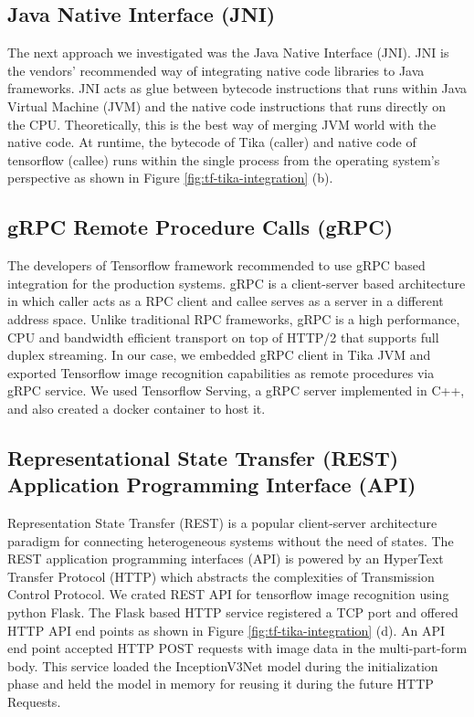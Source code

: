 \subsection{Java Native Interface (JNI)} \label{sec:int-jni}
The next approach we investigated was the Java Native Interface (JNI). JNI is the vendors' recommended way of integrating native code libraries to Java frameworks\cite{}. JNI acts as glue between bytecode instructions that runs within Java Virtual Machine (JVM) and the native  code instructions that runs directly on the CPU. Theoretically, this is the best way of merging JVM world with the native code\cite{}. At runtime, the bytecode of Tika (caller) and native code of tensorflow (callee) runs within the single process from the operating system's perspective as shown in Figure \ref{fig:tf-tika-integration} (b).


\subsection{gRPC Remote Procedure Calls (gRPC)} \label{sec:int-rpc}
The developers of Tensorflow framework recommended to use gRPC based integration for the production systems\cite{goog-tfserve}. gRPC is a client-server based architecture in which caller acts as a RPC client and callee serves as a server in a different address space. Unlike traditional RPC frameworks, gRPC is a high performance, CPU and bandwidth efficient transport on top of HTTP/2 that supports full duplex streaming\cite{about-grpc}. In our case, we embedded gRPC client in Tika JVM and exported Tensorflow image recognition capabilities as remote procedures via gRPC service. We used Tensorflow Serving, a gRPC server implemented in C++, and also created a docker container to host it.


\subsection{Representational State Transfer (REST) Application Programming Interface (API)} \label{sec:int-rest}
Representation State Transfer (REST) is a popular client-server architecture paradigm for connecting heterogeneous systems without the need of states\cite[Chapter~5]{Fielding:2000:ASD:932295}. The REST application programming interfaces (API) is powered by an HyperText Transfer Protocol (HTTP) which abstracts the complexities of Transmission Control Protocol.
We crated REST API for tensorflow image recognition using python Flask\cite{}. The Flask based HTTP service registered a TCP port and offered HTTP API end points as shown in Figure \ref{fig:tf-tika-integration} (d).
An API end point accepted HTTP POST requests with image data in the multi-part-form body. This service loaded the InceptionV3Net \cite{SzegedyVISW15} model during the initialization phase and held the model in memory for reusing it during the future HTTP Requests.

